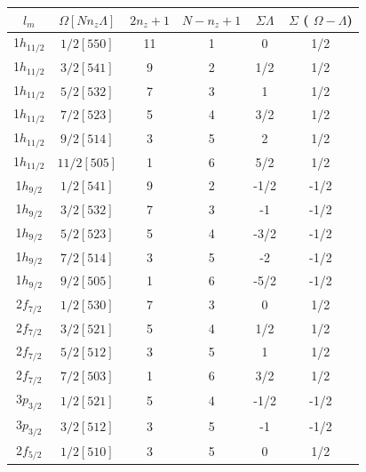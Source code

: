 \documentclass[10pt,a4paper, twoside]{report}
\begin{document}
\begin{table}[htbp]
\centering
\begin{tabular}{|c|c|c|c|c|c|}
\toprule
\toprule
$l_m$      & $\Omega[Nn_z\Lambda]$ & $2n_z + 1$ & $N - n_z + 1$ & $\Sigma\Lambda$ & $\Sigma$ ( $\Omega - \Lambda$) \\
\midrule
1$h_{11/2}$ & $1/2[550]$            & 11         & 1             & 0      & 1/2         \\
1$h_{11/2}$ & $3/2[541]$            & 9          & 2             & 1/2      & 1/2         \\
1$h_{11/2}$ & $5/2[532]$            & 7          & 3             & 1       & 1/2        \\
1$h_{11/2}$ & $7/2[523]$            & 5          & 4             & 3/2      & 1/2        \\
1$h_{11/2}$ & $9/2[514]$            & 3          & 5             & 2        & 1/2       \\
1$h_{11/2}$ & $11/2[505]$           & 1          & 6             & 5/2      & 1/2         \\
1$h_{9/2}$ & $1/2[541]$             & 9          & 2             & -1/2      & -1/2         \\
1$h_{9/2}$ & $3/2[532]$             & 7          & 3             & -1     & -1/2          \\
1$h_{9/2}$ & $5/2[523]$             & 5          & 4             & -3/2      & -1/2         \\
1$h_{9/2}$ & $7/2[514]$             & 3          & 5             & -2        & -1/2       \\
1$h_{9/2}$ & $9/2[505]$             & 1          & 6             & -5/2      & -1/2         \\
2$f_{7/2}$ & $1/2[530]$             & 7          & 3             & 0        & 1/2       \\
2$f_{7/2}$ & $3/2[521]$             & 5          & 4             & 1/2      & 1/2         \\
2$f_{7/2}$ & $5/2[512]$             & 3          & 5             & 1        & 1/2       \\
2$f_{7/2}$ & $7/2[503]$             & 1          & 6             & 3/2       & 1/2        \\
3$p_{3/2}$ & $1/2[521]$             & 5          & 4             & -1/2     & -1/2          \\
3$p_{3/2}$ & $3/2[512]$             & 3          & 5             & -1       & -1/2        \\
2$f_{5/2}$ & $1/2[510]$             & 3          & 5             & 0      & 1/2         \\

\end{tabular}
\end{table}
\end{document}
